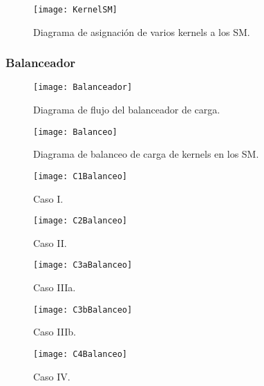     \begin{figure}[ht]
      \centering
        \texttt{[image: KernelSM]}
        \caption{Diagrama de asignación de varios kernels a los SM.}
        \label{fig:KernelSM}
    \end{figure}
    
\subsubsection{Balanceador}

    \begin{figure}[ht]
      \centering
        \texttt{[image: Balanceador]}
        \caption{Diagrama de flujo del balanceador de carga.}
        \label{fig:Balanceador}
    \end{figure}

        \begin{figure}[ht]
      \centering
        \texttt{[image: Balanceo]}
        \caption{Diagrama de balanceo de carga de kernels en los SM.}
        \label{fig:Balanceo}
    \end{figure}
    
    \begin{figure}[ht]
      \centering
        \texttt{[image: C1Balanceo]}
        \caption{Caso I.}
        \label{fig:C1Balanceo}
    \end{figure}
    
    \begin{figure}[ht]
      \centering
        \texttt{[image: C2Balanceo]}
        \caption{Caso II.}
        \label{fig:C2Balanceo}
    \end{figure}
    
    \begin{figure}[ht]
      \centering
        \texttt{[image: C3aBalanceo]}
        \caption{Caso IIIa.}
        \label{fig:C3aBalanceo}
    \end{figure}
    
    \begin{figure}[ht]
      \centering
        \texttt{[image: C3bBalanceo]}
        \caption{Caso IIIb.}
        \label{fig:C3bBalanceo}
    \end{figure}
    
    \begin{figure}[ht]
      \centering
        \texttt{[image: C4Balanceo]}
        \caption{Caso IV.}
        \label{fig:C4Balanceo}
    \end{figure}
    
